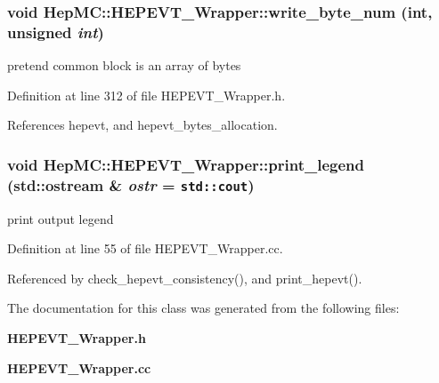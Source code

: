 \subsubsection{\setlength{\rightskip}{0pt plus 5cm}void Hep\-MC::HEPEVT\_\-Wrapper::write\_\-byte\_\-num (int, unsigned {\em int})\hspace{0.3cm}{\tt  [inline, static, protected]}}\label{classHepMC_1_1HEPEVT__Wrapper_a8092352be8d690540bb530aaad42d96}


pretend common block is an array of bytes 



Definition at line 312 of file HEPEVT\_\-Wrapper.h.

References hepevt, and hepevt\_\-bytes\_\-allocation.
\subsubsection{\setlength{\rightskip}{0pt plus 5cm}void Hep\-MC::HEPEVT\_\-Wrapper::print\_\-legend (std::ostream \& {\em ostr} = {\tt std::cout})\hspace{0.3cm}{\tt  [static, protected]}}\label{classHepMC_1_1HEPEVT__Wrapper_995dcf57c5d82f09dc79f15db3a42b70}


print output legend 



Definition at line 55 of file HEPEVT\_\-Wrapper.cc.

Referenced by check\_\-hepevt\_\-consistency(), and print\_\-hepevt().

The documentation for this class was generated from the following files:\begin{CompactItemize}
\item 
{\bf HEPEVT\_\-Wrapper.h}\item 
{\bf HEPEVT\_\-Wrapper.cc}\end{CompactItemize}
